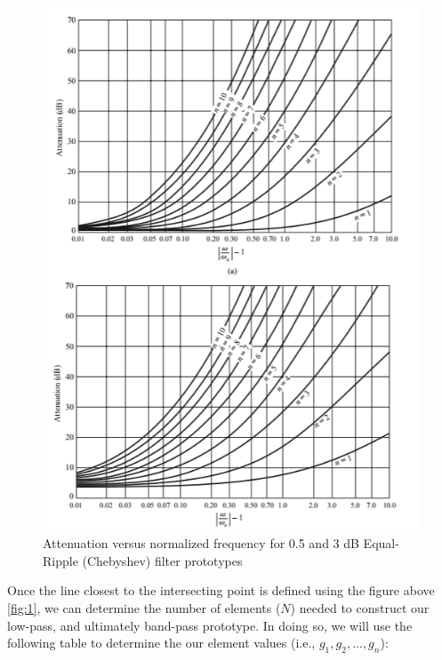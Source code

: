 \documentclass{article}
\begin{document}
\newpage
\begin{figure}[h!]
    \centering
    \includegraphics[scale=1.0]{images/chebyshev_attenuation_table.png}
    \caption{Attenuation versus normalized frequency for 0.5 and 3 dB Equal-Ripple (Chebyshev) filter prototypes}
    \label{fig:7}
\end{figure}
Once the line closest to the intersecting point is defined using the figure above \ref{fig:1}, we can determine the number of elements ($N$) needed to construct our low-pass, and ultimately band-pass prototype. In doing so, we will use the following table to determine the our element values (i.e., $g_1, g_2,...,g_n$):
\end{document}
